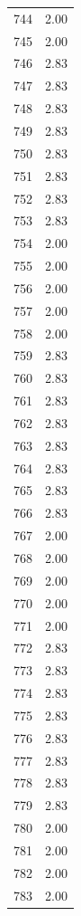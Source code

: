 \documentclass[a4paper,11pt]{article}
\begin{document}
\begin{center}
\begin{longtable}{|R{1.5cm}|R{2.5cm}|}
  744  &         2.00 \\ 
  745  &         2.00 \\ 
  746  &         2.83 \\ 
  747  &         2.83 \\ 
  748  &         2.83 \\ 
  749  &         2.83 \\ 
  750  &         2.83 \\ 
  751  &         2.83 \\ 
  752  &         2.83 \\ 
  753  &         2.83 \\ 
  754  &         2.00 \\ 
  755  &         2.00 \\ 
  756  &         2.00 \\ 
  757  &         2.00 \\ 
  758  &         2.00 \\ 
  759  &         2.83 \\ 
  760  &         2.83 \\ 
  761  &         2.83 \\ 
  762  &         2.83 \\ 
  763  &         2.83 \\ 
  764  &         2.83 \\ 
  765  &         2.83 \\ 
  766  &         2.83 \\ 
  767  &         2.00 \\ 
  768  &         2.00 \\ 
  769  &         2.00 \\ 
  770  &         2.00 \\ 
  771  &         2.00 \\ 
  772  &         2.83 \\ 
  773  &         2.83 \\ 
  774  &         2.83 \\ 
  775  &         2.83 \\ 
  776  &         2.83 \\ 
  777  &         2.83 \\ 
  778  &         2.83 \\ 
  779  &         2.83 \\ 
  780  &         2.00 \\ 
  781  &         2.00 \\ 
  782  &         2.00 \\ 
  783  &         2.00 \\ 

\end{longtable}
\end{center}
\end{document}
